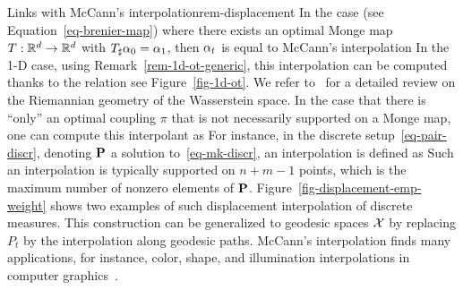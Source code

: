 \begin{rem11}{Links with McCann's interpolation}{rem-displacement}
In the case (see Equation~\eqref{eq-brenier-map}) where there exists an optimal Monge map $\T : \RR^\dim \rightarrow \RR^\dim$ with $\T_\sharp \al_0=\al_1$, then $\al_t$ is equal to McCann's interpolation
In the 1-D case, using Remark~\ref{rem-1d-ot-generic}, this interpolation can be computed thanks to the relation
see Figure~\ref{fig-1d-ot}. We refer to~\citet{gangbo1996geometry} for a detailed review on the Riemannian geometry of the Wasserstein space.
%
In the case that there is ``only'' an optimal coupling $\pi$ that is not necessarily supported on a Monge map, one can compute this interpolant as
For instance, in the discrete setup~\eqref{eq-pair-discr}, denoting $\P$ a solution to~\eqref{eq-mk-discr}, an interpolation is defined as
Such an interpolation is typically supported on $n+m-1$ points, which is the maximum number of nonzero elements of $\P$.
%
Figure~\ref{fig-displacement-emp-weight} shows two examples of such displacement interpolation of discrete measures. 
%
This construction can be generalized to geodesic spaces $\Xx$ by replacing $P_t$ by the interpolation along geodesic paths.
%
McCann's interpolation finds many applications, for instance, color, shape, and illumination interpolations in computer graphics~\citep{Bonneel-displacement}. 
\end{rem11}



